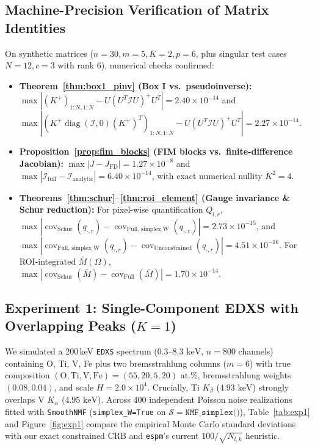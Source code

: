 \documentclass[11pt,a4paper]{article}
\theoremstyle{plain}
\theoremstyle{definition}
\theoremstyle{remark}
\newcommand{\cS}{\mathcal{S}}
\newcommand{\cI}{\mathcal{I}}
\newcommand{\diag}{\operatorname{diag}}
\newcommand{\cov}{\operatorname{cov}}
\newcommand{\pinv}{^{+}}
\begin{document}
\subsection{Machine-Precision Verification of Matrix Identities}
On synthetic matrices ($n=30, m=5, K=2, p=6$, plus singular test cases $N=12, c=3$ with rank $6$), numerical checks confirmed:
\begin{itemize}[leftmargin=1.5em]
    \item \textbf{Theorem~\ref{thm:box1_pinv} (Box I vs.\ pseudoinverse):} $\max|(K\pinv)_{1:N,1:N} - U(U^T \cI U)\pinv U^T| = 2.40 \times 10^{-14}$ and $\max|(K\pinv \diag(\cI,0)(K\pinv)^T)_{1:N,1:N} - U(U^T\cI U)\pinv U^T| = 2.27 \times 10^{-14}$.
    \item \textbf{Proposition~\ref{prop:fim_blocks} (FIM blocks vs.\ finite-difference Jacobian):} $\max|J - J_{\text{FD}}| = 1.27 \times 10^{-8}$ and $\max|\cI_{\text{full}} - \cI_{\text{analytic}}| = 6.40 \times 10^{-14}$, with exact numerical nullity $K^2 = 4$.
    \item \textbf{Theorems~\ref{thm:schur}--\ref{thm:roi_element} (Gauge invariance \& Schur reduction):} For pixel-wise quantification $Q_{l,r}$, $\max|\cov_{\text{Schur}}(q_{\cdot, r}) - \cov_{\text{Full, simplex\_W}}(q_{\cdot, r})| = 2.73 \times 10^{-15}$, and $\max|\cov_{\text{Full, simplex\_W}}(q_{\cdot, r}) - \cov_{\text{Unconstrained}}(q_{\cdot, r})| = 4.51 \times 10^{-16}$. For ROI-integrated $\bar{M}(\Omega)$, $\max|\cov_{\text{Schur}}(\bar{M}) - \cov_{\text{Full}}(\bar{M})| = 1.70 \times 10^{-14}$.
\end{itemize}

\subsection{Experiment 1: Single-Component EDXS with Overlapping Peaks (\texorpdfstring{$K=1$}{K=1})}
We simulated a 200\,keV \texttt{EDXS} spectrum ($0.3\text{--}8.3\text{ keV}$, $n=800$ channels) containing O, Ti, V, Fe plus two bremsstrahlung columns ($m=6$) with true composition $(\text{O},\text{Ti},\text{V},\text{Fe}) = (55, 20, 5, 20)\text{ at.}\%$, bremsstrahlung weights $(0.08, 0.04)$, and scale $H = 2.0\times 10^4$. Crucially, Ti $K_\beta$ ($4.93\text{ keV}$) strongly overlaps V $K_\alpha$ ($4.95\text{ keV}$). Across $400$ independent Poisson noise realizations fitted with \texttt{SmoothNMF} (\texttt{simplex\_W=True} on $\cS = \texttt{NMF\_simplex()}$), Table~\ref{tab:exp1} and Figure~\ref{fig:exp1} compare the empirical Monte Carlo standard deviations with our exact constrained CRB and \texttt{espm}'s current $100/\sqrt{N_{l,k}}$ heuristic.
\end{document}
